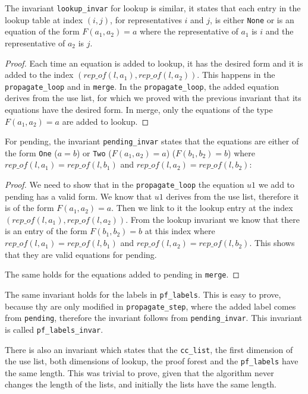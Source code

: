 The invariant \lstinline|lookup_invar| for lookup is similar, it states that each entry in the lookup table at index $(i, j)$, for representatives $i$ and $j$, is either \lstinline{None} or is an equation of the form $F(a_1, a_2) = a$ where the representative of $a_1$ is $i$ and the representative of $a_2$ is $j$.

\begin{proof}
Each time an equation is added to lookup, it has the desired form and it is added to the index $(rep\_of(l, a_1), rep\_of(l, a_2))$. This happens in the \lstinline{propagate_loop} and in \lstinline{merge}. In the \lstinline{propagate_loop}, the added equation derives from the use list, for which we proved with the previous invariant that its equations have the desired form. In merge, only the equations of the type $F(a_1, a_2) = a$ are added to lookup.
\end{proof}

For pending, the invariant \lstinline|pending_invar| states that the equations are either of the form \lstinline{One} ($a = b$) or \lstinline{Two} ($F(a_1, a_2) = a$) ($F(b_1, b_2) = b$) where $rep\_of(l, a_1) = rep\_of(l, b_1)$ and $rep\_of(l, a_2) = rep\_of(l, b_2)$:

\begin{proof}
We need to show that in the \lstinline{propagate_loop} the equation $u1$ we add to pending has a valid form. We know that $u1$ derives from the use list, therefore it is of the form $F(a_1, a_2) = a$. Then we link to it the lookup entry at the index $(rep\_of(l, a_1), rep\_of(l, a_2))$. From the lookup invariant we know that there is an entry of the form $F(b_1, b_2) = b$ at this index where $rep\_of(l, a_1) = rep\_of(l, b_1)$ and $rep\_of(l, a_2) = rep\_of(l, b_2)$. This shows that they are valid equations for pending.

The same holds for the equations added to pending in \lstinline{merge}.
\end{proof}

The same invariant holds for the labels in \lstinline|pf_labels|. This is easy to prove,  because thy are only modified in \lstinline|propagate_step|, where the added label comes from \lstinline|pending|, therefore the invariant follows from \lstinline|pending_invar|. This invariant is called \lstinline|pf_labels_invar|.

There is also an invariant which states that the \lstinline{cc_list}, the first dimension of the use list, both dimensions of lookup, the proof forest and the \lstinline{pf_labels} have the same length. This was trivial to prove, given that the algorithm never changes the length of the lists, and initially the lists have the same length.

